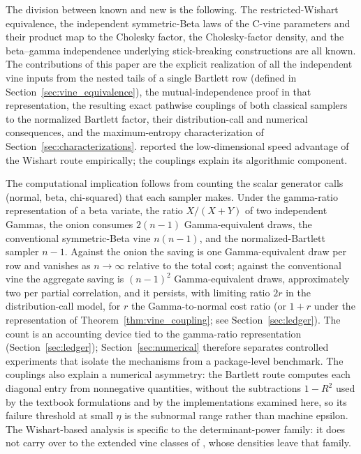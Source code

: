 \documentclass[12pt,english]{article}
\theoremstyle{plain} %
\theoremstyle{definition} %
\theoremstyle{remark} %
\begin{document}
The division between known and new is the following. The restricted-Wishart equivalence, the independent symmetric-Beta laws of the C-vine parameters and their product map to the Cholesky factor, the Cholesky-factor density, and the beta--gamma independence underlying stick-breaking constructions are all known. The contributions of this paper are the explicit realization of all the independent vine inputs from the nested tails of a single Bartlett row (defined in Section~\ref{sec:vine_equivalence}), the mutual-independence proof in that representation, the resulting exact pathwise couplings of both classical samplers to the normalized Bartlett factor, their distribution-call and numerical consequences, and the maximum-entropy characterization of Section~\ref{sec:characterizations}. \citet{WangWuChu:2018} reported the low-dimensional speed advantage of the Wishart route empirically; the couplings explain its algorithmic component.

The computational implication follows from counting the scalar generator calls (normal, beta, chi-squared) that each sampler makes. Under the gamma-ratio representation of a beta variate, the ratio $X/(X+Y)$ of two independent Gammas, the onion consumes $2(n-1)$ Gamma-equivalent draws, the conventional symmetric-Beta vine $n(n-1)$, and the normalized-Bartlett sampler $n-1$. Against the onion the saving is one Gamma-equivalent draw per row and vanishes as $n\to\infty$ relative to the total cost; against the conventional vine the aggregate saving is $(n-1)^2$ Gamma-equivalent draws, approximately two per partial correlation, and it persists, with limiting ratio $2r$ in the distribution-call model, for $r$ the Gamma-to-normal cost ratio (or $1+r$ under the representation of Theorem~\ref{thm:vine_coupling}; see Section~\ref{sec:ledger}). The count is an accounting device tied to the gamma-ratio representation (Section~\ref{sec:ledger}); Section~\ref{sec:numerical} therefore separates controlled experiments that isolate the mechanisms from a package-level benchmark. The couplings also explain a numerical asymmetry: the Bartlett route computes each diagonal entry from nonnegative quantities, without the subtractions $1-R^2$ used by the textbook formulations and by the implementations examined here, so its failure threshold at small $\eta$ is the subnormal range rather than machine epsilon. The Wishart-based analysis is specific to the determinant-power family: it does not carry over to the extended vine classes of \citet{JoeKurowicka:2026}, whose densities leave that family.
\end{document}

